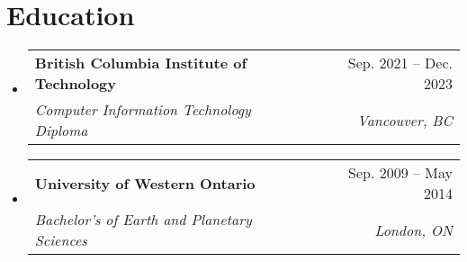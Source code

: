 \documentclass[letterpaper,11pt]{article}
\makeatletter
\newcommand{\resumeSubheading}[4]{
  \vspace{-2pt}\item
    \begin{tabular*}{0.97\textwidth}[t]{l@{\extracolsep{\fill}}r}
      \textbf{#1} & #2 \\
      \textit{\small#3} & \textit{\small #4} \\
    \end{tabular*}\vspace{-7pt}
}
\newcommand{\resumeSubHeadingListStart}{\begin{itemize}[leftmargin=0.15in, label={}]}
\newcommand{\resumeSubHeadingListEnd}{\end{itemize}}
\makeatother
\begin{document}
\section{Education}
\resumeSubHeadingListStart
  \resumeSubheading
    {British Columbia Institute of Technology}{Sep. 2021 -- Dec. 2023}
    {Computer Information Technology Diploma}{Vancouver, BC}
  \resumeSubheading
    {University of Western Ontario}{Sep. 2009 -- May 2014}
    {Bachelor's of Earth and Planetary Sciences}{London, ON}
\resumeSubHeadingListEnd


\end{document}
